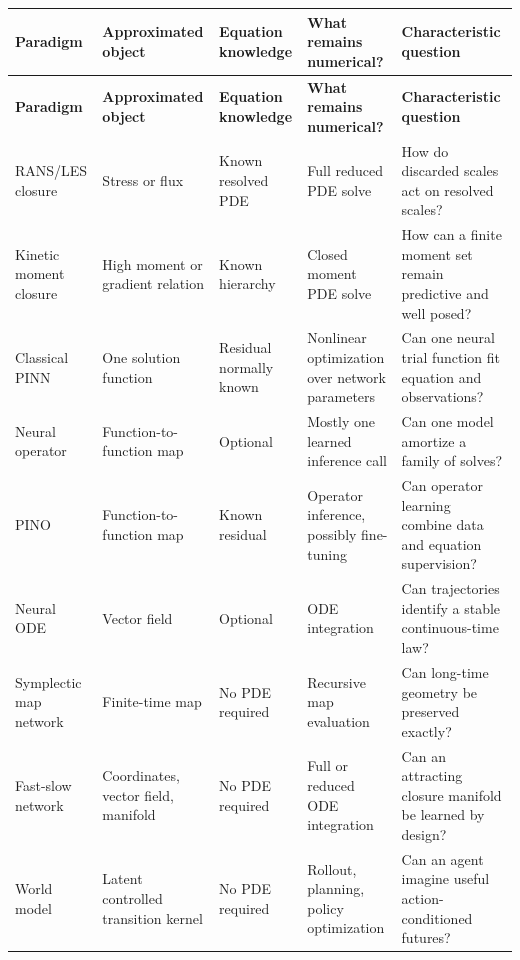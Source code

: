 \documentclass[11pt]{article}
\begin{document}
\begin{longtable}{@{}P{0.145\textwidth}P{0.18\textwidth}P{0.18\textwidth}P{0.18\textwidth}P{0.21\textwidth}@{}}
\toprule
\textbf{Paradigm} & \textbf{Approximated object} & \textbf{Equation knowledge} & \textbf{What remains numerical?} & \textbf{Characteristic question} \\
\midrule
\endfirsthead
\toprule
\textbf{Paradigm} & \textbf{Approximated object} & \textbf{Equation knowledge} & \textbf{What remains numerical?} & \textbf{Characteristic question} \\
\midrule
\endhead
RANS/LES closure & Stress or flux & Known resolved PDE & Full reduced PDE solve & How do discarded scales act on resolved scales? \\
Kinetic moment closure & High moment or gradient relation & Known hierarchy & Closed moment PDE solve & How can a finite moment set remain predictive and well posed? \\
Classical PINN & One solution function & Residual normally known & Nonlinear optimization over network parameters & Can one neural trial function fit equation and observations? \\
Neural operator & Function-to-function map & Optional & Mostly one learned inference call & Can one model amortize a family of solves? \\
PINO & Function-to-function map & Known residual & Operator inference, possibly fine-tuning & Can operator learning combine data and equation supervision? \\
Neural ODE & Vector field & Optional & ODE integration & Can trajectories identify a stable continuous-time law? \\
Symplectic map network & Finite-time map & No PDE required & Recursive map evaluation & Can long-time geometry be preserved exactly? \\
Fast-slow network & Coordinates, vector field, manifold & No PDE required & Full or reduced ODE integration & Can an attracting closure manifold be learned by design? \\
World model & Latent controlled transition kernel & No PDE required & Rollout, planning, policy optimization & Can an agent imagine useful action-conditioned futures? \\
\bottomrule
\end{longtable}



\end{document}
